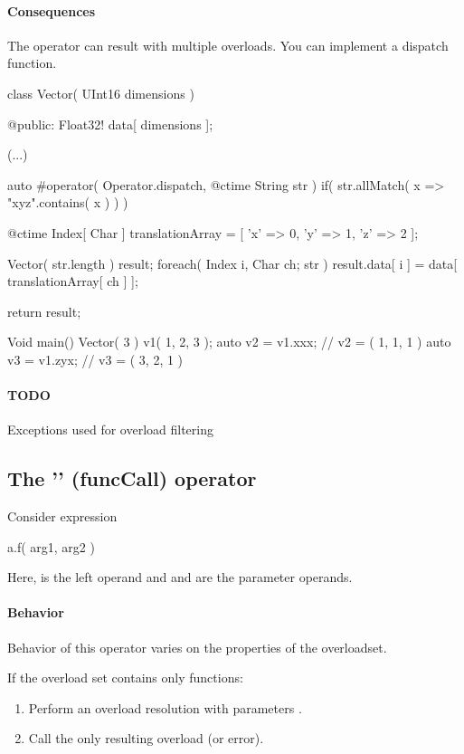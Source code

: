 \paragraph{Consequences}
The  operator can result with multiple overloads. You can implement a dispatch function.

\begin{code}
class Vector( UInt16 dimensions ) {

@public:
	Float32! data[ dimensions ];
	
	(...)
	
	auto #operator( Operator.dispatch, @ctime String str )
		if( str.allMatch( x => "xyz".contains( x ) ) )
	{
		@ctime Index[ Char ] translationArray = [
			'x' => 0,
			'y' => 1,
			'z' => 2
		];
		
		Vector( str.length )	result;
		foreach( Index i, Char ch; str )
			result.data[ i ] = data[ translationArray[ ch ] ];
			
		return result;
	}
			

}

Void main() {
	Vector( 3 ) v1( 1, 2, 3 );
	auto v2 = v1.xxx; // v2 = ( 1, 1, 1 )
	auto v3 = v1.zyx; // v3 = ( 3, 2, 1 )
}
\end{code}

\paragraph{TODO} Exceptions used for overload filtering

\subsection{The '' (funcCall) operator}
Consider expression
\begin{code}
a.f( arg1, arg2 )
\end{code}

Here,  is the left operand and  and  are the parameter operands.

\paragraph{Behavior}
Behavior of this operator varies on the properties of the overloadset.

If the overload set contains only functions:
\begin{enumerate}
	\item Perform an overload resolution with parameters .
	\item Call the only resulting overload (or error).
\end{enumerate}

